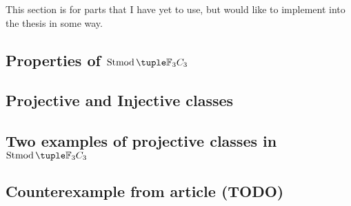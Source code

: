 
This section is for parts that I have yet to use, but would like to implement into the thesis in some way.

\subsection{Properties of \texorpdfstring{\( \Stmod{\Fb_3 C_3} \)}{Stmod(F\_3C\_3)}} 


\subsection{Projective and Injective classes}


\subsection{Two examples of projective classes in \texorpdfstring{\( \Stmod{\Fb_3 C_3} \)}{Stmod(F\_3C\_3)}}


\subsection{Counterexample from article (TODO)}
